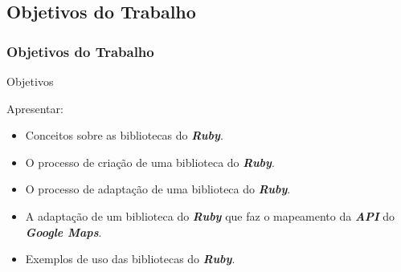  \subsection{Objetivos do Trabalho}
 \begin{frame}
  \frametitle{Objetivos do Trabalho}

  \begin{block}{Objetivos}

   Apresentar:

   \begin{itemize}

    \item  Conceitos sobre as bibliotecas do \emph{\textbf{Ruby}}.

    \item  O processo de criação de uma biblioteca do \emph{\textbf{Ruby}}.

    \item  O processo de adaptação de uma biblioteca do \emph{\textbf{Ruby}}.
    
    \item  A adaptação de um biblioteca do \emph{\textbf{Ruby}} que faz o mapeamento
    da \emph{\textbf{API}} do \emph{\textbf{Google Maps}}.

    \item  Exemplos de uso das bibliotecas do \emph{\textbf{Ruby}}.

   \end{itemize}

  \end{block}

\end{frame}